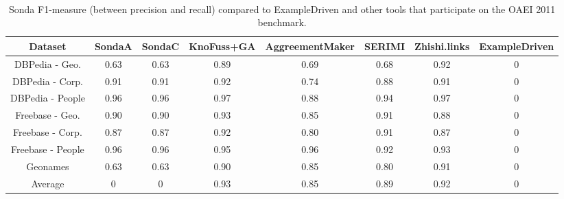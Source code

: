 \begin{center}
\begin{table}[h]
\centering
\scriptsize\tt
\caption{Sonda F1-measure (between precision and recall) compared to ExampleDriven and other tools that participate on the OAEI 2011 benchmark.} 
\begin{tabular}{|c|c|c|c|c|c|c|c|}
\hline
Dataset  &  SondaA  &  SondaC & KnoFuss+GA & AggreementMaker & SERIMI & Zhishi.links & ExampleDriven\\ \hline
DBPedia - Geo. & 0.63 & 0.63  & 0.89 & 0.69 & 0.68 & 0.92 & 0 \\ \hline
DBPedia - Corp. & 0.91 & 0.91 & 0.92 & 0.74 & 0.88 & 0.91 & 0\\ \hline
DBPedia - People & 0.96 & 0.96 & 0.97 & 0.88 & 0.94 & 0.97 & 0\\ \hline
Freebase - Geo. & 0.90 & 0.90 & 0.93 & 0.85 & 0.91 & 0.88 & 0\\ \hline
Freebase - Corp. & 0.87 & 0.87 & 0.92 & 0.80 & 0.91 & 0.87 & 0\\ \hline
Freebase - People & 0.96 &  0.96 & 0.95 & 0.96 & 0.92 & 0.93 & 0\\ \hline
Geonames & 0.63 & 0.63  & 0.90 & 0.85 & 0.80 & 0.91 & 0\\ \hline
Average & 0 & 0  & 0.93 & 0.85 & 0.89 &  0.92 & 0\\ \hline											 
\end{tabular}  
\end{table} 
\end{center}

